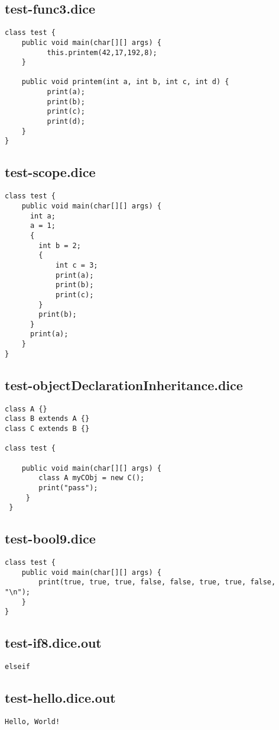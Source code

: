 \subsection{test-func3.dice}
\begin{verbatim}
class test {
	public void main(char[][] args) {
		  this.printem(42,17,192,8);
	}

	public void printem(int a, int b, int c, int d) {
		  print(a);
		  print(b);
		  print(c);
		  print(d);
	}
}

\end{verbatim}
\pagebreak
\subsection{test-scope.dice}
\begin{verbatim}
class test {
	public void main(char[][] args) {
	  int a;
	  a = 1;
	  {
	  	int b = 2;
	  	{
	  		int c = 3;
	  		print(a);
	  		print(b);
	  		print(c);
	  	}
	  	print(b);
	  }
	  print(a);
	}
}

\end{verbatim}
\pagebreak
\subsection{test-objectDeclarationInheritance.dice}
\begin{verbatim}
class A {}
class B extends A {}
class C extends B {}

class test {

	public void main(char[][] args) {
		class A myCObj = new C();
		print("pass");
	 }
 }
\end{verbatim}
\pagebreak
\subsection{test-bool9.dice}
\begin{verbatim}
class test {
    public void main(char[][] args) {
        print(true, true, true, false, false, true, true, false, "\n");
    }
}
\end{verbatim}
\pagebreak
\subsection{test-if8.dice.out}
\begin{verbatim}
elseif
\end{verbatim}
\pagebreak
\subsection{test-hello.dice.out}
\begin{verbatim}
Hello, World!
\end{verbatim}
\pagebreak
